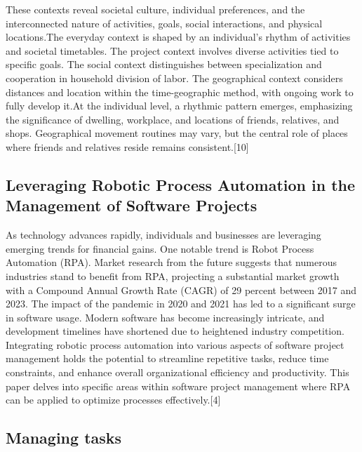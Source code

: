 \documentclass{chart}
\begin{document}
\hspace{1cm}These contexts reveal societal culture, individual preferences, and the interconnected nature of activities, goals, social interactions, and physical locations.The everyday context is shaped by an individual's rhythm of activities and societal timetables. The project context involves diverse activities tied to specific goals. The social context distinguishes between specialization and cooperation in household division of labor. The geographical context considers distances and location within the time-geographic method, with ongoing work to fully develop it.At the individual level, a rhythmic pattern emerges, emphasizing the significance of dwelling, workplace, and locations of friends, relatives, and shops. Geographical movement routines may vary, but the central role of places where friends and relatives reside remains consistent.[10]
\subsection{Leveraging Robotic Process Automation in the Management of Software Projects} 
\hspace{1cm}As technology advances rapidly, individuals and businesses are leveraging emerging trends for financial gains. One notable trend is Robot Process Automation (RPA). Market research from the future suggests that numerous industries stand to benefit from RPA, projecting a substantial market growth with a Compound Annual Growth Rate (CAGR) of 29 percent between 2017 and 2023. The impact of the pandemic in 2020 and 2021 has led to a significant surge in software usage. Modern software has become increasingly intricate, and development timelines have shortened due to heightened industry competition. Integrating robotic process automation into various aspects of software project management holds the potential to streamline repetitive tasks, reduce time constraints, and enhance overall organizational efficiency and productivity. This paper delves into specific areas within software project management where RPA can be applied to optimize processes effectively.[4]
\subsection{Managing  tasks} 
\end{document}

